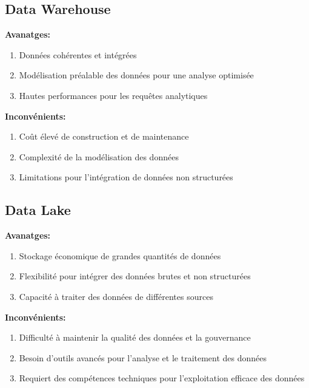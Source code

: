 
\subsection{Data Warehouse}
\textbf{Avanatges:}
\begin{enumerate}
    \item Données cohérentes et intégrées
    \item Modélisation préalable des données pour une analyse optimisée
    \item Hautes performances pour les requêtes analytiques
\end{enumerate}

\textbf{Inconvénients:}
\begin{enumerate}
    \item Coût élevé de construction et de maintenance
    \item Complexité de la modélisation des données
    \item Limitations pour l'intégration de données non structurées
\end{enumerate}

\subsection{Data Lake}
\textbf{Avanatges:}
\begin{enumerate}
    \item Stockage économique de grandes quantités de données
    \item Flexibilité pour intégrer des données brutes et non structurées
    \item Capacité à traiter des données de différentes sources
\end{enumerate}

\textbf{Inconvénients:}
\begin{enumerate}
    \item Difficulté à maintenir la qualité des données et la gouvernance
    \item Besoin d'outils avancés pour l'analyse et le traitement des données
    \item Requiert des compétences techniques pour l'exploitation efficace des données
\end{enumerate}

